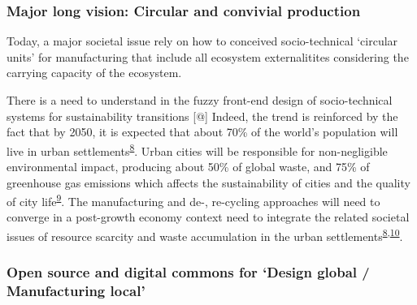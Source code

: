 \documentclass[
  11pt,
  a4paperpaper,
  onecolumn]{article}
\begin{document}
\hypertarget{major-long-vision-circular-and-convivial-production}{%
\subsubsection{Major long vision: Circular and convivial
production}\label{major-long-vision-circular-and-convivial-production}}

Today, a major societal issue rely on how to conceived socio-technical
`circular units' for manufacturing that include all ecosystem
externalitites considering the carrying capacity of the ecosystem.

There is a need to understand in the fuzzy front-end design of
socio-technical systems for sustainability transitions {[}@{]} Indeed,
the trend is reinforced by the fact that by 2050, it is expected that
about 70\% of the world's population will live in urban
settlements\textsuperscript{\protect\hyperlink{ref-savini2021}{8}}.
Urban cities will be responsible for non-negligible environmental
impact, producing about 50\% of global waste, and 75\% of greenhouse gas
emissions which affects the sustainability of cities and the quality of
city life\textsuperscript{\protect\hyperlink{ref-Riffat2016}{9}}. The
manufacturing and de-, re-cycling approaches will need to converge in a
post-growth economy context need to integrate the related societal
issues of resource scarcity and waste accumulation in the urban
settlements\textsuperscript{\protect\hyperlink{ref-savini2021}{8},\protect\hyperlink{ref-kallis2018}{10}}.

\hypertarget{open-source-and-digital-commons-for-design-global-manufacturing-local}{%
\subsubsection{Open source and digital commons for `Design global /
Manufacturing
local'}\label{open-source-and-digital-commons-for-design-global-manufacturing-local}}
\end{document}
